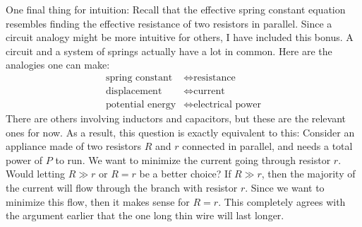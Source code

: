 \documentclass{article}
\begin{document}
One final thing for intuition: Recall that the effective spring constant equation resembles finding the effective resistance of two resistors in parallel. Since a circuit analogy might be more intuitive for others, I have included this bonus. A circuit and a system of springs actually have a lot in common. Here are the analogies one can make:
\begin{align}
    \text{spring constant}  &\iff \text{resistance} \\
    \text{displacement}     &\iff \text{current} \\ 
    \text{potential energy} &\iff \text{electrical power} 
    \label{eq:}
\end{align}
There are others involving inductors and capacitors, but these are the relevant ones for now. As a result, this question is exactly equivalent to this: Consider an appliance made of two resistors $R$ and $r$ connected in parallel, and needs a total power of $P$ to run. We want to minimize the current going through resistor $r$. Would letting $R \gg r$ or $R=r$ be a better choice? If $R \gg r$, then the majority of the current will flow through the branch with resistor $r$. Since we want to minimize this flow, then it makes sense for $R=r$. This completely agrees with the argument earlier that the one long thin wire will last longer.
\end{document}

